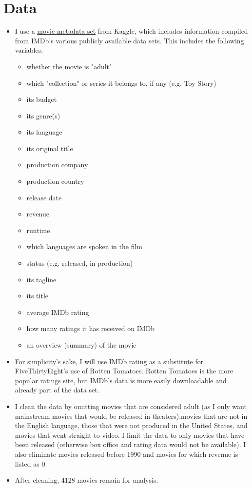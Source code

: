 \documentclass{article}
\begin{document}
\section{Data}
\begin{itemize}
    \item I use a \href{https://www.kaggle.com/rounakbanik/the-movies-dataset#movies_metadata.csv}{movie metadata set} from Kaggle, which includes information compiled from IMDb's various publicly available data sets. This includes the following variables:
    \begin{itemize}
         \item whether the movie is "adult"
        \item which "collection" or series it belongs to, if any (e.g. Toy Story)
        \item its budget
        \item its genre(s)
        \item its language
        \item its original title
        \item production company
        \item production country
        \item release date
        \item revenue
        \item runtime
        \item which languages are spoken in the film
        \item status (e.g. released, in production)
        \item its tagline
        \item its title
        \item average IMDb rating
        \item how many ratings it has received on IMDb
        \item an overview (summary) of the movie
    \end{itemize}
    \item For simplicity's sake, I will use IMDb rating as a substitute for FiveThirtyEight's use of Rotten Tomatoes. Rotten Tomatoes is the more popular ratings site, but IMDb's data is more easily downloadable and already part of the data set.
    \item I clean the data by omitting movies that are considered adult (as I only want mainstream movies that would be released in theaters),movies that are not in the English language, those that were not produced in the United States, and movies that went straight to video. I limit the data to only movies that have been released (otherwise box office and rating data would not be available). I also eliminate movies released before 1990 and movies for which revenue is listed as 0.
    \item After cleaning, 4128 movies remain for analysis.
\end{itemize}
\end{document}
